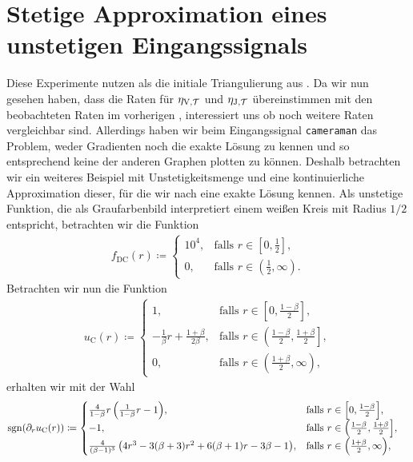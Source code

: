 \section{Stetige Approximation eines unstetigen Eingangssignals}
Diese Experimente nutzen als die initiale Triangulierung aus
.
Da wir nun gesehen haben, dass die Raten für $\eta_{\textup{V}, \mathcal{T}}$ und $\eta_{\textup{J}, \mathcal{T}}$ übereinstimmen
mit den beobachteten Raten im vorherigen
, interessiert uns ob noch weitere
Raten vergleichbar sind. 
Allerdings haben wir beim Eingangssignal \texttt{cameraman} das Problem,
weder Gradienten noch die exakte Lösung zu kennen und so entsprechend keine
der anderen Graphen plotten zu können.
Deshalb betrachten wir ein weiteres Beispiel mit Unstetigkeitsmenge und 
eine kontinuierliche Approximation dieser, für die wir nach
 eine exakte Lösung kennen.
Als unstetige Funktion, die als Graufarbenbild interpretiert einem 
weißen Kreis mit Radius $1/2$ entspricht, betrachten wir die Funktion
\begin{align*}
  f_\textrm{DC}(r)\coloneqq 
  \begin{cases}
    10^4, 
    & \text{falls } r\in \left[0,\frac{1}{2}\right]\!,\\
    0, 
    & \text{falls } r\in \left(\frac{1}{2},\infty\right)\!.
  \end{cases}
\end{align*}
Betrachten wir nun die Funktion
\begin{align*}
  u_\textrm{C}(r)\coloneqq 
  \begin{cases}
    1, 
    & \text{falls } r\in \left[0,\frac{1-\beta}{2}\right]\!,\\
    -\frac{1}{\beta}r + \frac{1+\beta}{2\beta}, 
    & \text{falls } r\in \left(\frac{1-\beta}{2}, \frac{1+\beta}{2}\right]\!,\\
    0,
    & \text{falls } r\in \left(\frac{1+\beta}{2},\infty\right)\!,
  \end{cases}
\end{align*}
erhalten wir mit der Wahl
\begin{align*}
  \operatorname{sgn}(\partial_r u_\textrm{C}(r)) 
  &\coloneqq 
  \begin{cases}
    \frac{4}{1-\beta}r\left(\frac{1}{1-\beta}r -1\right)\!, 
    & \text{falls } r\in \left[0,\frac{1-\beta}{2}\right]\!,\\
    -1,
    & \text{falls } r\in \left(\frac{1-\beta}{2}, \frac{1+\beta}{2}\right]\!,\\
    \frac{4}{(\beta-1)^3}
    \left( 4r^3-3(\beta+3)r^2 +6(\beta+1)r-3\beta-1\right)\!, 
    & \text{falls } r\in \left(\frac{1+\beta}{2},\infty\right)\!,
  \end{cases}
\end{align*}
